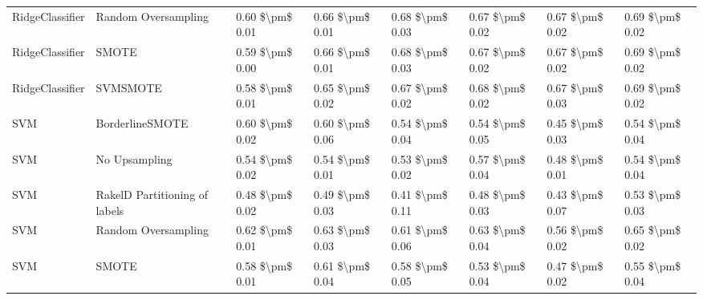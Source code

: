 \begin{tabular}{llllllll}
                RidgeClassifier &           Random Oversampling & 0.60 \$\textbackslash pm\$ 0.01 &           0.66 \$\textbackslash pm\$ 0.01 &       0.68 \$\textbackslash pm\$ 0.03 &        0.67 \$\textbackslash pm\$ 0.02 &                         0.67 \$\textbackslash pm\$ 0.02 & 0.69 \$\textbackslash pm\$ 0.02 \\
                RidgeClassifier &                         SMOTE & 0.59 \$\textbackslash pm\$ 0.00 &           0.66 \$\textbackslash pm\$ 0.01 &       0.68 \$\textbackslash pm\$ 0.03 &        0.67 \$\textbackslash pm\$ 0.02 &                         0.67 \$\textbackslash pm\$ 0.02 & 0.69 \$\textbackslash pm\$ 0.02 \\
                RidgeClassifier &                      SVMSMOTE & 0.58 \$\textbackslash pm\$ 0.01 &           0.65 \$\textbackslash pm\$ 0.02 &       0.67 \$\textbackslash pm\$ 0.02 &        0.68 \$\textbackslash pm\$ 0.02 &                         0.67 \$\textbackslash pm\$ 0.03 & 0.69 \$\textbackslash pm\$ 0.02 \\
                            SVM &               BorderlineSMOTE & 0.60 \$\textbackslash pm\$ 0.02 &           0.60 \$\textbackslash pm\$ 0.06 &       0.54 \$\textbackslash pm\$ 0.04 &        0.54 \$\textbackslash pm\$ 0.05 &                         0.45 \$\textbackslash pm\$ 0.03 & 0.54 \$\textbackslash pm\$ 0.04 \\
                            SVM &                 No Upsampling & 0.54 \$\textbackslash pm\$ 0.02 &           0.54 \$\textbackslash pm\$ 0.01 &       0.53 \$\textbackslash pm\$ 0.02 &        0.57 \$\textbackslash pm\$ 0.04 &                         0.48 \$\textbackslash pm\$ 0.01 & 0.54 \$\textbackslash pm\$ 0.04 \\
                            SVM & RakelD Partitioning of labels & 0.48 \$\textbackslash pm\$ 0.02 &           0.49 \$\textbackslash pm\$ 0.03 &       0.41 \$\textbackslash pm\$ 0.11 &        0.48 \$\textbackslash pm\$ 0.03 &                         0.43 \$\textbackslash pm\$ 0.07 & 0.53 \$\textbackslash pm\$ 0.03 \\
                            SVM &           Random Oversampling & 0.62 \$\textbackslash pm\$ 0.01 &           0.63 \$\textbackslash pm\$ 0.03 &       0.61 \$\textbackslash pm\$ 0.06 &        0.63 \$\textbackslash pm\$ 0.04 &                         0.56 \$\textbackslash pm\$ 0.02 & 0.65 \$\textbackslash pm\$ 0.02 \\
                            SVM &                         SMOTE & 0.58 \$\textbackslash pm\$ 0.01 &           0.61 \$\textbackslash pm\$ 0.04 &       0.58 \$\textbackslash pm\$ 0.05 &        0.53 \$\textbackslash pm\$ 0.04 &                         0.47 \$\textbackslash pm\$ 0.02 & 0.55 \$\textbackslash pm\$ 0.04 \\

\end{tabular}

